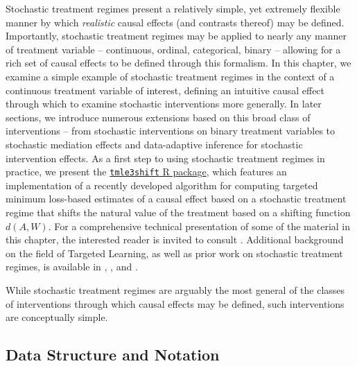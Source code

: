 \documentclass[12pt, krantz2,]{krantz}
\theoremstyle{definition}
\theoremstyle{definition}
\theoremstyle{definition}
\newcommand{\1}{\mathbbm{1}}
\begin{document}
Stochastic treatment regimes present a relatively simple, yet extremely flexible
manner by which \emph{realistic} causal effects (and contrasts thereof) may be
defined. Importantly, stochastic treatment regimes may be applied to nearly
any manner of treatment variable -- continuous, ordinal, categorical, binary --
allowing for a rich set of causal effects to be defined through this formalism.
In this chapter, we examine a simple example of stochastic treatment regimes in
the context of a continuous treatment variable of interest, defining an
intuitive causal effect through which to examine stochastic interventions more
generally. In later sections, we introduce numerous extensions based on this
broad class of interventions -- from stochastic interventions on binary
treatment variables to stochastic mediation effects and data-adaptive inference
for stochastic intervention effects. As a first step to using stochastic
treatment regimes in practice, we present the \href{https://github.com/tlverse/tmle3shift}{\texttt{tmle3shift} R
package}, which features an
implementation of a recently developed algorithm for computing targeted minimum
loss-based estimates of a causal effect based on a stochastic treatment regime
that shifts the natural value of the treatment based on a shifting function
\(d(A,W)\). For a comprehensive technical presentation of some of the material in
this chapter, the interested reader is invited to consult \citet{diaz2018stochastic}.
Additional background on the field of Targeted Learning, as well as prior work
on stochastic treatment regimes, is available in \citet{vdl2011targeted},
\citet{vdl2018targeted}, and \citet{diaz2012population}.

While stochastic treatment regimes are arguably the most general of the
classes of interventions through which causal effects may be defined, such
interventions are conceptually simple.

\hypertarget{data-structure-and-notation-1}{%
\subsection{Data Structure and Notation}\label{data-structure-and-notation-1}}
\end{document}
